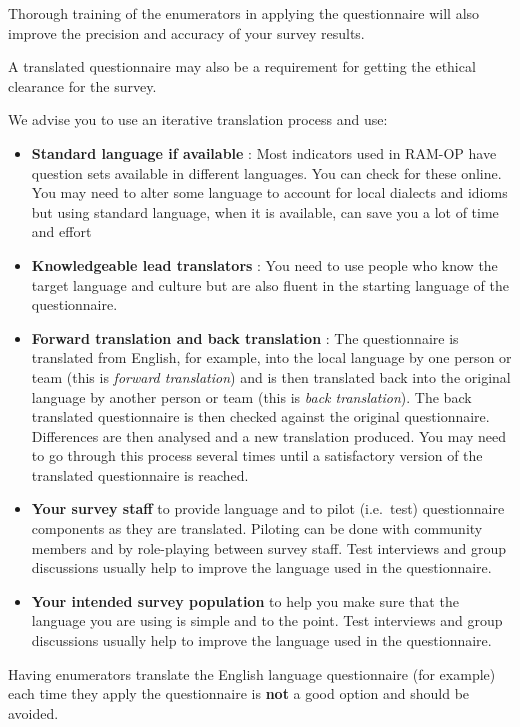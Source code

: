 \documentclass[12pt,a4paper]{book}
\begin{document}
Thorough training of the enumerators in applying the questionnaire will also improve the precision and accuracy of your survey results.

A translated questionnaire may also be a requirement for getting the ethical clearance for the survey.

We advise you to use an iterative translation process and use:

\begin{itemize}
\item
  \textbf{Standard language if available} : Most indicators used in RAM-OP have question sets available in different languages. You can check for these online. You may need to alter some language to account for local dialects and idioms but using standard language, when it is available, can save you a lot of time and effort
\item
  \textbf{Knowledgeable lead translators} : You need to use people who know the target language and culture but are also fluent in the starting language of the questionnaire.
\item
  \textbf{Forward translation and back translation} : The questionnaire is translated from English, for example, into the local language by one person or team (this is \emph{forward translation}) and is then translated back into the original language by another person or team (this is \emph{back translation}). The back translated questionnaire is then checked against the original questionnaire. Differences are then analysed and a new translation produced. You may need to go through this process several times until a satisfactory version of the translated questionnaire is reached.
\item
  \textbf{Your survey staff} to provide language and to pilot (i.e.~test) questionnaire components as they are translated. Piloting can be done with community members and by role-playing between survey staff. Test interviews and group discussions usually help to improve the language used in the questionnaire.
\item
  \textbf{Your intended survey population} to help you make sure that the language you are using is simple and to the point. Test interviews and group discussions usually help to improve the language used in the questionnaire.
\end{itemize}

Having enumerators translate the English language questionnaire (for example) each time they apply the questionnaire is \textbf{not} a good option and should be avoided.
\end{document}
